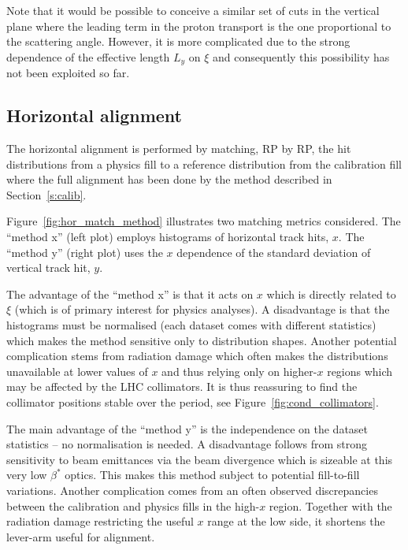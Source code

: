 \documentclass[TOTEM]{cern/cernphprep}
\begin{document}
Note that it would be possible to conceive a similar set of cuts in the vertical plane where the leading term in the proton transport is the one proportional to the scattering angle. However, it is more complicated due to the strong dependence of the effective length $L_y$ on $\xi$ and consequently this possibility has not been exploited so far.

\subsection{Horizontal alignment}
\label{s:phys-horizontal}

The horizontal alignment is performed by matching, RP by RP, the hit distributions from a physics fill to a reference distribution from the calibration fill where the full alignment has been done by the method described in Section~\ref{s:calib}.

Figure~\ref{fig:hor_match_method} illustrates two matching metrics considered. The ``method x'' (left plot) employs histograms of horizontal track hits, $x$. The ``method y'' (right plot) uses the $x$ dependence of the standard deviation of vertical track hit, $y$.

The advantage of the ``method x'' is that it acts on $x$ which is directly related to $\xi$ (which is of primary interest for physics analyses). A disadvantage is that the histograms must be normalised (each dataset comes with different statistics) which makes the method sensitive only to distribution shapes. Another potential complication stems from radiation damage which often makes the distributions unavailable at lower values of $x$ and thus relying only on higher-$x$ regions which may be affected by the LHC collimators. It is thus reassuring to find the collimator positions stable over the period, see Figure~\ref{fig:cond_collimators}.

The main advantage of the ``method y'' is the independence on the dataset statistics -- no normalisation is needed. A disadvantage follows from strong sensitivity to beam emittances via the beam divergence which is sizeable at this very low $\beta^*$ optics. This makes this method subject to potential fill-to-fill variations. Another complication comes from an often observed discrepancies between the calibration and physics fills in the high-$x$ region. Together with the radiation damage restricting the useful $x$ range at the low side, it shortens the lever-arm useful for alignment.
\end{document}
